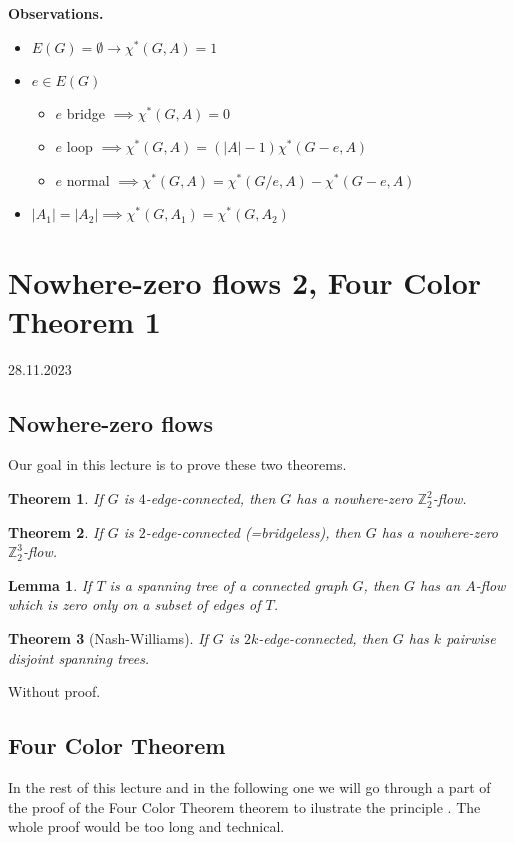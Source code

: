 \documentclass{article}
\newtheorem*{theorem}{Theorem}
\newtheorem*{lemma}{Lemma}
\newcommand{\Z}{\mathbb{Z}}
\begin{document}
\noindent
\textbf{Observations.}
\begin{itemize}
	\item $E(G) = \emptyset \rightarrow \chi^*(G,A) = 1$
	\item $e \in E(G)$
		\begin{itemize}
			\item $e$ bridge $\implies \chi^*(G, A) = 0$
			\item $e$ loop $\implies \chi^*(G, A) =
				(|A|-1)\chi^*(G-e,A)$
			\item $e$ normal $\implies \chi^*(G, A) = \chi^*(G / e,
				A) - \chi^*(G - e, A)$
		\end{itemize}
	\item $|A_1| = |A_2| \implies \chi^*(G,A_1) = \chi^*(G,A_2)$
\end{itemize}


\newpage
\section{Nowhere-zero flows 2, Four Color Theorem 1} %
28.11.2023

\subsection*{Nowhere-zero flows}
Our goal in this lecture is to prove these two theorems.

\begin{theorem}
	If $G$ is $4$-edge-connected, then $G$ has a nowhere-zero
	$\Z_2^2$-flow.
\end{theorem}

\begin{theorem}
	If $G$ is $2$-edge-connected (=bridgeless), then $G$ has a nowhere-zero
	$\Z_2^3$-flow.
\end{theorem}

\begin{lemma}
	If $T$ is a spanning tree of a connected graph $G$, then $G$ has an
	$A$-flow which is zero only on a subset of edges of $T$.
\end{lemma}

\begin{theorem}[Nash-Williams]
	If $G$ is $2k$-edge-connected, then $G$ has $k$ pairwise disjoint
	spanning trees.
\end{theorem}

\noindent
Without proof.


\subsection*{Four Color Theorem}
In the rest of this lecture and in the following one we will go through a part
of the proof of the Four Color Theorem theorem to ilustrate the principle . The
whole proof would be too long and technical.
\end{document}
